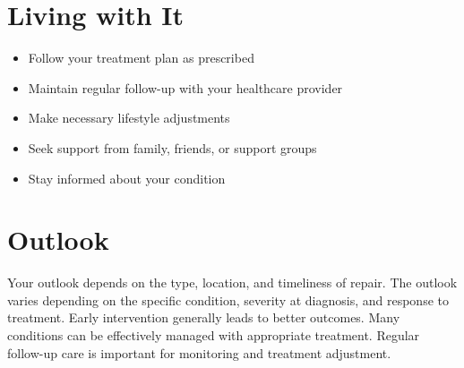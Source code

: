 \section{Living with It}
\begin{itemize}[noitemsep]
  \item Follow your treatment plan as prescribed
  \item Maintain regular follow-up with your healthcare provider
  \item Make necessary lifestyle adjustments
  \item Seek support from family, friends, or support groups
  \item Stay informed about your condition
\end{itemize}
\section{Outlook}
Your outlook depends on the type, location, and timeliness of repair. The outlook varies depending on the specific condition, severity at diagnosis, and response to treatment. Early intervention generally leads to better outcomes. Many conditions can be effectively managed with appropriate treatment. Regular follow-up care is important for monitoring and treatment adjustment.
